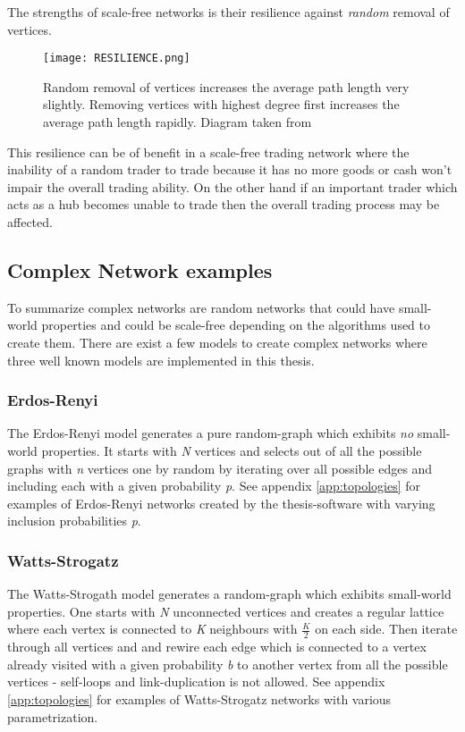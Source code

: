 \documentclass[../Bachelorarbeit.tex]{subfiles}
\begin{document}
\medskip

The strengths of scale-free networks is their resilience against \textit{random} removal of vertices.

\begin{figure}[H]
	\centering
  \texttt{[image: RESILIENCE.png]}
  	\caption{Random removal of vertices increases the average path length very slightly. Removing vertices with highest degree first increases the average path length rapidly. Diagram taken from \cite{Newman_ComplexNetworks} }
	\label{fig:RESILIENCE}
\end{figure}

This resilience can be of benefit in a scale-free trading network where the inability of a random trader to trade because it has no more goods or cash won't impair the overall trading ability. On the other hand if an important trader which acts as a hub becomes unable to trade then the overall trading process may be affected.

\subsection{Complex Network examples}
To summarize complex networks are random networks that could have small-world properties and could be scale-free depending on the algorithms used to create them. There are exist a few models to create complex networks where three well known models are implemented in this thesis.

\subsubsection{Erdos-Renyi}
The Erdos-Renyi model generates a pure random-graph which exhibits \textit{no} small-world properties. It starts with \textit{N} vertices and selects out of all the possible graphs with \textit{n} vertices one by random by iterating over all possible edges and including each with a given probability \textit{p}. See appendix \ref{app:topologies} for examples of Erdos-Renyi networks created by the thesis-software with varying inclusion probabilities \textit{p}.

\subsubsection{Watts-Strogatz}
The Watts-Strogath model generates a random-graph which exhibits small-world properties. One starts with \textit{N} unconnected vertices and creates a regular lattice where each vertex is connected to \textit{K} neighbours with $\frac{K}{2}$ on each side. Then iterate through all vertices and and rewire each edge which is connected to a vertex already visited with a given probability \textit{b} to another vertex from all the possible vertices - self-loops and link-duplication is not allowed. See appendix \ref{app:topologies} for examples of Watts-Strogatz networks with various parametrization.
\end{document}

